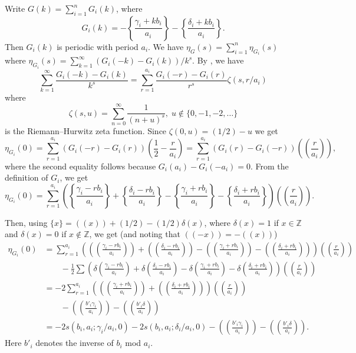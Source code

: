 \documentclass{amsart}
\theoremstyle{definition}
\theoremstyle{remark}
\numberwithin{equation}{section}
\begin{document}
Write $G(k) = \sum_{i=1}^n G_i(k)$, where
\[
G_i(k) = -\left\{ \frac{ \gamma_i + kb_i}{a_i} \right\} - \left\{ \frac{\delta_i + kb_i}{a_i} \right\}.
\]
Then $G_i(k)$ is periodic with period $a_i$. We have $\eta_G(s) = \sum_{i=1}^n \eta_{G_i}(s)$ where $\eta_{G_i}(s) = \sum_{k = 1}^{\infty} ( G_i(-k) - G_i(k) )/k^s$. By \cite[Lemma 1.5]{nic2}, we have
\[
\sum_{k=1}^{\infty} \frac{G_i(-k) - G_i(k)}{k^s} = \sum_{r = 1}^{a_i} \frac{ G_i(-r) - G_i(r) }{r^s } \zeta(s,r/a_i)
\]
where
\[
\zeta(s,u) = \sum_{n = 0}^{\infty} \frac{1}{(n+u)^s}, \; u \notin \{0,-1,-2, \dots \}
\]
is the Riemann--Hurwitz zeta function. Since $\zeta(0,u) = (1/2) - u$ we get
\[
\eta_{G_i}(0) = \sum_{r=1}^{a_i} ( G_i(-r) - G_i(r) ) \left( \frac{1}{2} - \frac{r}{a_i} \right) = \sum_{r=1}^{a_i} ( G_i(r) - G_i(-r) ) \left( \! \left( \frac{r}{a_i} \right) \! \right),
\]
where the second equality follows because $G_i(a_i) - G_i(-a_i) = 0$. From the definition of $G_i$, we get
\[
\eta_{G_i}(0) = \sum_{r=1}^{a_i} \left( \left\{ \frac{\gamma_i - rb_i}{a_i} \right\} + \left\{ \frac{\delta_i - rb_i}{a_i} \right\} - \left\{ \frac{\gamma_i + rb_i}{a_i} \right\} - \left\{ \frac{\delta_i + rb_i}{a_i} \right\} \right) \left( \! \left( \frac{r}{a_i} \right) \! \right).
\]

Then, using $\{x\} = ((x)) + (1/2) - (1/2)\delta(x)$, where $\delta(x) = 1$ if $x \in \mathbb{Z}$ and $\delta(x) = 0$ if $x \notin \mathbb{Z}$, we get (and noting that $((-x)) = -((x))$)
\begin{align*}
\eta_{
G_i}(0) &= \sum_{r=1}^{a_i} \left( \left( \! \left( \frac{ \gamma_i - rb_i}{a_i} \right) \! \right) + \left( \! \left( \frac{\delta_i - rb_i}{a_i} \right) \! \right) - \left( \! \left( \frac{ \gamma_i + rb_i}{a_i} \right) \! \right) - \left( \! \left( \frac{\delta_i + rb_i}{a_i} \right) \! \right) \right) \left( \! \left( \frac{r}{a_i} \right) \! \right) \\
& \quad \quad -\frac{1}{2} \sum \left( \delta\left( \frac{\gamma_i - rb_i}{a_i} \right) + \delta \left( \frac{\delta_i - rb_i}{a_i} \right) - \delta \left( \frac{\gamma_i + rb_i}{a_i }\right) - \delta \left( \frac{\delta_i +rb_i}{a_i} \right) \right) \left( \! \left( \frac{r}{a_i} \right) \! \right) \\
& = -2\sum_{r=1}^{a_i} \left( \left( \! \left( \frac{ \gamma_i + rb_i}{a_i} \right) \! \right) + \left( \! \left( \frac{\delta_i + rb_i}{a_i} \right) \! \right) \right) \left( \! \left( \frac{r}{a_i} \right) \! \right) \\
& \quad \quad -\left( \! \left( \frac{ b'_i \gamma_i}{a_i} \right) \! \right) -  \left( \! \left( \frac{b'_i \delta}{a_i} \right) \! \right) \\
& = -2 s(b_i , a_i ; \gamma_i/a_i , 0) - 2s(b_i , a_i ; \delta_i/a_i , 0)  -\left( \! \left( \frac{ b'_i \gamma_i}{a_i} \right) \! \right) -  \left( \! \left( \frac{b'_i \delta}{a_i} \right) \! \right).
\end{align*}
Here $b'_i$ denotes the inverse of $b_i$ mod $a_i$.
\end{document}
